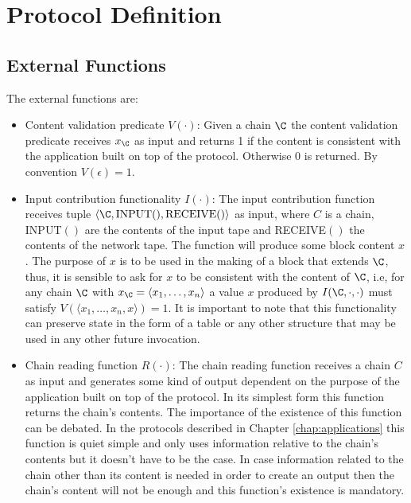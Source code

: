 \documentclass[..]{subfiles}
\begin{document}
\section{Protocol Definition}

\subsection{External Functions}

The external functions are:
\begin{itemize}
	\item Content validation predicate $V(\cdot)$: Given a chain $\C$ the content validation predicate receives $x_\C$ as input and returns 1 if the content is consistent with the application built on top of the protocol. Otherwise 0 is returned. By convention $V(\epsilon) = 1$.

	\item Input contribution functionality $I(\cdot)$: The input contribution function receives tuple ${\langle \C, \textrm{INPUT}(), \textrm{RECEIVE}() \rangle}$ as input, where $C$ is a chain, INPUT$()$ are the contents of the input tape and RECEIVE$()$ the contents of the network tape. The function will produce some block content $x$ . The purpose of $x$ is to be used in the making of a block that extends $\C$, thus, it is sensible to ask for $x$ to be consistent with the content of $\C$, i.e, for any chain $\C$ with $x_\C = \langle x_1, \dots, x_n \rangle$ a value $x$ produced by $I(\C, \cdot, \cdot)$ must satisfy $V(\langle x_1, \dots, x_n, x \rangle) = 1$. It is important to note that this functionality can preserve state in the form of a table or any other structure that may be used in any other future invocation.

	\item Chain reading function $R(\cdot)$: The chain reading function receives a chain $C$ as input and generates some kind of output dependent on the purpose of the application built on top of the protocol. In its simplest form this function returns the chain's contents. The importance of the existence of this function can be debated. In the protocols described in Chapter \ref{chap:applications} this function is quiet simple and only uses information relative to the chain's contents but it doesn't have to be the case. In case information related to the chain other than its content is needed in order to create an output then the chain's content will not be enough and this function's existence is mandatory.
\end{itemize}
\end{document}
